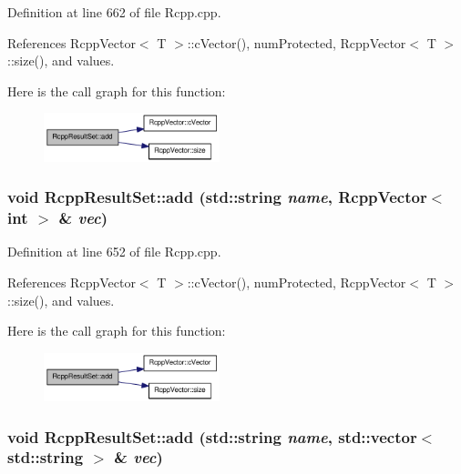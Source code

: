 Definition at line 662 of file Rcpp.cpp.

References RcppVector$<$ T $>$::cVector(), numProtected, RcppVector$<$ T $>$::size(), and values.

Here is the call graph for this function:\nopagebreak
\begin{figure}[H]
\begin{center}
\leavevmode
\includegraphics[width=145pt]{classRcppResultSet_a10a64eb042cd3bac5b635670ae2fff5d_cgraph}
\end{center}
\end{figure}
\hypertarget{classRcppResultSet_a068cb13e27c0e26dd05e92d67eaeb7d0}{
\subsubsection[{add}]{\setlength{\rightskip}{0pt plus 5cm}void RcppResultSet::add (std::string {\em name}, \/  {\bf RcppVector}$<$ int $>$ \& {\em vec})}}
\label{classRcppResultSet_a068cb13e27c0e26dd05e92d67eaeb7d0}


Definition at line 652 of file Rcpp.cpp.

References RcppVector$<$ T $>$::cVector(), numProtected, RcppVector$<$ T $>$::size(), and values.

Here is the call graph for this function:\nopagebreak
\begin{figure}[H]
\begin{center}
\leavevmode
\includegraphics[width=145pt]{classRcppResultSet_a068cb13e27c0e26dd05e92d67eaeb7d0_cgraph}
\end{center}
\end{figure}
\hypertarget{classRcppResultSet_adb4236a049c8dceb7112229f5e68a295}{
\subsubsection[{add}]{\setlength{\rightskip}{0pt plus 5cm}void RcppResultSet::add (std::string {\em name}, \/  std::vector$<$ std::string $>$ \& {\em vec})}}
\label{classRcppResultSet_adb4236a049c8dceb7112229f5e68a295}


